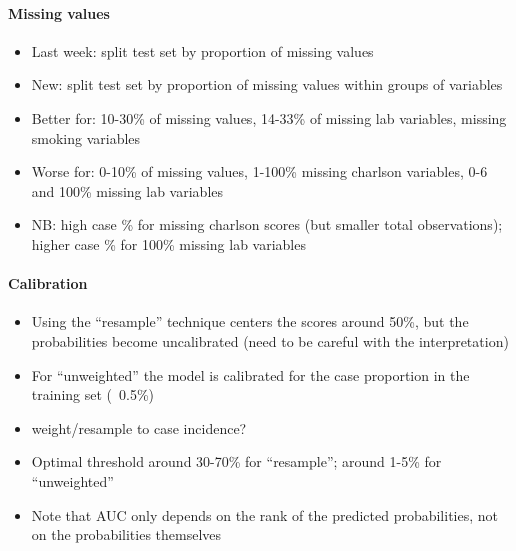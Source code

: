 \documentclass[12pt]{article}
\begin{document}
\paragraph*{Missing values}
	\begin{itemize}
		\item Last week: split test set by proportion of missing values
		\item New: split test set by proportion of missing values within groups of variables
		\item Better for: 10-30\% of missing values, 14-33\% of missing lab variables, missing smoking variables
		\item Worse for: 0-10\% of missing values, 1-100\% missing charlson variables, 0-6 and 100\% missing lab variables
		\item NB: high case \% for missing charlson scores (but smaller total observations); higher case \% for 100\% missing lab variables
	\end{itemize}

\paragraph*{Calibration}

\begin{itemize}
	\item Using the ``resample'' technique centers the scores around 50\%,
	but the probabilities become uncalibrated (need to be careful with the interpretation)
	\item For ``unweighted'' the model is calibrated for the case proportion in the training set (~0.5\%)
	\item weight/resample to case incidence?
	\item Optimal threshold around 30-70\% for ``resample''; around 1-5\% for ``unweighted''
	\item Note that AUC only depends on the rank of the predicted probabilities,
	not on the probabilities themselves
\end{itemize}

\newpage
\end{document}
